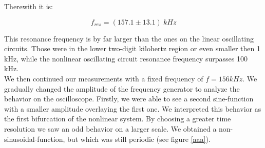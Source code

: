 Therewith it is:

$$f_{res}=(157.1 \pm 13.1)\ kHz$$

This resonance frequency is by far larger than the ones on the linear oscillating circuits. Those were in the lower two-digit kilohertz region or even smaller then 1 kHz, while the nonlinear oscillating circuit resonance frequency surpasses 100 kHz.\\
We then continued our measurements with a fixed frequency of $f = 156 kHz$.
We gradually changed the amplitude of the frequency generator to analyze the behavior on the oscilloscope. Firstly, we were able to see a second sine-function with a smaller amplitude overlaying the first one. We interpreted this behavior as the first bifurcation of the nonlinear system. By choosing a greater time resolution we saw an odd behavior on a larger scale. We obtained a non-sinusoidal-function, but which was still periodic (see figure \ref{aaa}).

